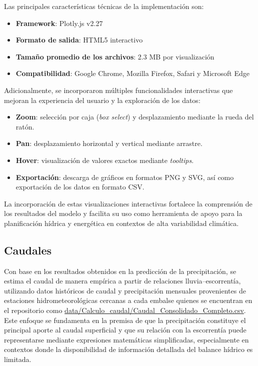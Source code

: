 Las principales características técnicas de la implementación son:

\begin{itemize}
    \item \textbf{Framework}: Plotly.js v2.27
    \item \textbf{Formato de salida}: HTML5 interactivo
    \item \textbf{Tamaño promedio de los archivos}: 2.3 MB por visualización
    \item \textbf{Compatibilidad}: Google Chrome, Mozilla Firefox, Safari y Microsoft Edge
\end{itemize}

Adicionalmente, se incorporaron múltiples funcionalidades interactivas que mejoran la experiencia del usuario y la exploración de los datos:

\begin{itemize}
    \item \textbf{Zoom}: selección por caja (\textit{box select}) y desplazamiento mediante la rueda del ratón.
    \item \textbf{Pan}: desplazamiento horizontal y vertical mediante arrastre.
    \item \textbf{Hover}: visualización de valores exactos mediante \textit{tooltips}.
    \item \textbf{Exportación}: descarga de gráficos en formatos PNG y SVG, así como exportación de los datos en formato CSV.
\end{itemize}

La incorporación de estas visualizaciones interactivas fortalece la comprensión de los resultados del modelo y facilita su uso como herramienta de apoyo para la planificación hídrica y energética en contextos de alta variabilidad climática.


\subsection{Caudales}
Con base en los resultados obtenidos en la predicción de la precipitación, se estima el caudal de manera empírica a partir de relaciones lluvia–escorrentía, utilizando datos históricos de caudal y precipitación mensuales provenientes de estaciones hidrometeorológicas cercanas a cada embalse quienes se encuentran en el repositorio como \url{data/Calculo_caudal/Caudal_Consolidado_Completo.csv}. Este enfoque se fundamenta en la premisa de que la precipitación constituye el principal aporte al caudal superficial y que su relación con la escorrentía puede representarse mediante expresiones matemáticas simplificadas, especialmente en contextos donde la disponibilidad de información detallada del balance hídrico es limitada\cite{sitterson2018_overview_rainfall_runoff}. 

